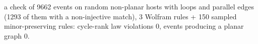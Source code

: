 a check of 9662 events on random non-planar hosts with loops and parallel edges (1293 of them with a non-injective match), 3 Wolfram rules + 150 sampled minor-preserving rules: cycle-rank law violations 0, events producing a planar graph 0. 